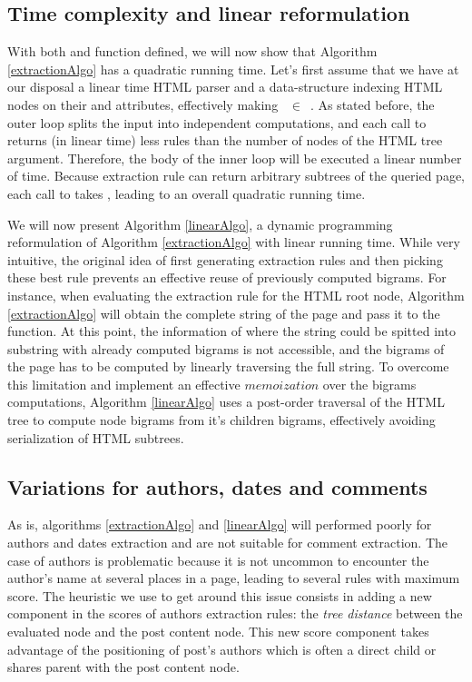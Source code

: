 \similarityAlgo


\subsection{Time complexity and linear reformulation}
With both  and  function defined, we will now show that Algorithm \ref{extractionAlgo} has a quadratic running time. Let's first assume that we have at our disposal a linear time HTML parser and a data-structure indexing HTML nodes on their  and  attributes, effectively making ~$\in$~. As stated before, the outer loop splits the input into independent computations, and each call to  returns (in linear time) less rules than the number of nodes of the HTML tree argument. Therefore, the body of the inner loop will be executed a linear number of time. Because extraction rule can return arbitrary subtrees of the queried page, each call to  takes , leading to an overall quadratic running time.

\linearAlgo

We will now present Algorithm \ref{linearAlgo}, a dynamic programming reformulation of Algorithm \ref{extractionAlgo} with linear running time. While very intuitive, the original idea of first generating extraction rules and then picking these best rule prevents an effective reuse of previously computed bigrams. For instance, when evaluating the extraction rule for the HTML root node, Algorithm \ref{extractionAlgo} will obtain the complete string of the page and pass it to the  function. At this point, the information of where the string could be spitted into substring with already computed bigrams is not accessible, and the bigrams of the page has to be computed by linearly traversing the full string. To overcome this limitation and implement an effective $memoization$ over the bigrams computations, Algorithm \ref{linearAlgo} uses a post-order traversal of the HTML tree to compute node bigrams from it's children bigrams, effectively avoiding serialization of HTML subtrees.


\subsection{Variations for authors, dates and comments}
As is, algorithms \ref{extractionAlgo} and \ref{linearAlgo} will performed poorly for authors and dates extraction and are not suitable for comment extraction. The case of authors is problematic because it is not uncommon to encounter the author's name at several places in a page, leading to several rules with maximum score. The heuristic we use to get around this issue consists in adding a new component in the scores of authors extraction rules: the \emph{tree distance} between the evaluated node and the post content node. This new score component takes advantage of the positioning of post's authors which is often a direct child or shares parent with the post content node.

